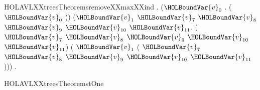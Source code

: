 \begin{SaveVerbatim}{HOLAVLXXtreesTheoremsremoveXXmaxXXind}
\HOLTokenTurnstile{} \HOLSymConst{\HOLTokenForall{}}. (\HOLSymConst{\HOLTokenForall{}}\ensuremath{\HOLBoundVar{v}\sb{\mathrm{0}}}   .  ( \ensuremath{\HOLBoundVar{v}\sb{\mathrm{0}}}    )) \HOLSymConst{\HOLTokenConj{}}
       (\HOLSymConst{\HOLTokenForall{}}\ensuremath{\HOLBoundVar{v}\sb{\mathrm{1}}}    \ensuremath{\HOLBoundVar{v}\sb{\mathrm{7}}} \ensuremath{\HOLBoundVar{v}\sb{\mathrm{8}}} \ensuremath{\HOLBoundVar{v}\sb{\mathrm{9}}} \ensuremath{\HOLBoundVar{v}\sb{\mathrm{10}}} \ensuremath{\HOLBoundVar{v}\sb{\mathrm{11}}}.
           ( \ensuremath{\HOLBoundVar{v}\sb{\mathrm{7}}} \ensuremath{\HOLBoundVar{v}\sb{\mathrm{8}}} \ensuremath{\HOLBoundVar{v}\sb{\mathrm{9}}} \ensuremath{\HOLBoundVar{v}\sb{\mathrm{10}}} \ensuremath{\HOLBoundVar{v}\sb{\mathrm{11}}}) \HOLSymConst{\HOLTokenImp{}}
           ( \ensuremath{\HOLBoundVar{v}\sb{\mathrm{1}}}    ( \ensuremath{\HOLBoundVar{v}\sb{\mathrm{7}}} \ensuremath{\HOLBoundVar{v}\sb{\mathrm{8}}} \ensuremath{\HOLBoundVar{v}\sb{\mathrm{9}}} \ensuremath{\HOLBoundVar{v}\sb{\mathrm{10}}} \ensuremath{\HOLBoundVar{v}\sb{\mathrm{11}}}))) \HOLSymConst{\HOLTokenConj{}}   \HOLSymConst{\HOLTokenImp{}}
       \HOLSymConst{\HOLTokenForall{}}.  
\end{SaveVerbatim}
\newcommand{\HOLAVLXXtreesTheoremsremoveXXmaxXXind}{\UseVerbatim{HOLAVLXXtreesTheoremsremoveXXmaxXXind}}
\begin{SaveVerbatim}{HOLAVLXXtreesTheoremstOne}
\HOLTokenTurnstile{}     \HOLSymConst{=}      
\end{SaveVerbatim}
\newcommand{\HOLAVLXXtreesTheoremstOne}{\UseVerbatim{HOLAVLXXtreesTheoremstOne}}
